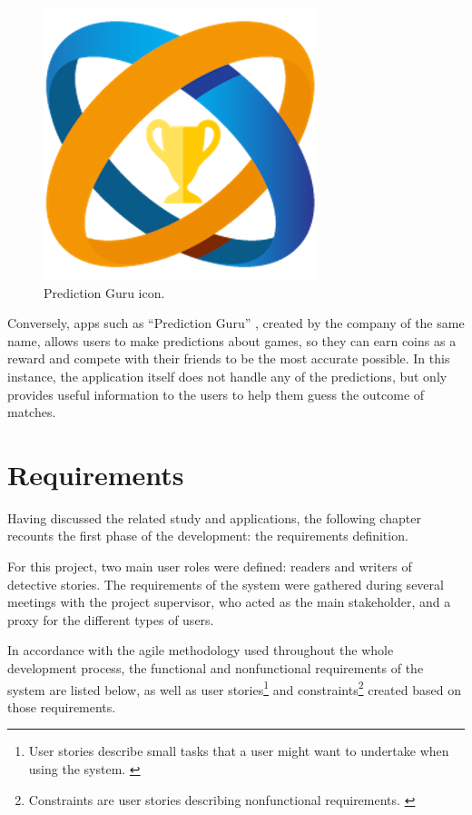 \documentclass{mproj}
\begin{document}
\begin{figure}
	\vspace{-10pt}
	\centering
	\includegraphics[scale=0.25]{images/prediction_guru}
	\caption{Prediction Guru icon.}
	\vspace{-30pt}
\end{figure}

Conversely, apps such as ``Prediction Guru'' \cite{predictionguru}, created by the company of the same name, allows users to make predictions about games, so they can earn coins as a reward and compete with their friends to be the most accurate possible. In this instance, the application itself does not handle any of the predictions, but only provides useful information to the users to help them guess the outcome of matches.

\chapter{Requirements}

Having discussed the related study and applications, the following chapter recounts the first phase of the development: the requirements definition. \par

For this project, two main user roles were defined: readers and writers of detective stories. The requirements of the system were gathered during several meetings with the project supervisor, who acted as the main stakeholder, and a proxy for the different types of users. \par 

In accordance with the agile methodology used throughout the whole development process, the functional and nonfunctional requirements of the system are listed below, as well as user stories\footnote{User stories describe small tasks that a user might want to undertake when using the system. \cite[Chapter~1]{userstoriesbook}} and constraints\footnote{Constraints are user stories describing nonfunctional requirements. \cite{userstoriesbook}} created based on those requirements. 
\end{document}
